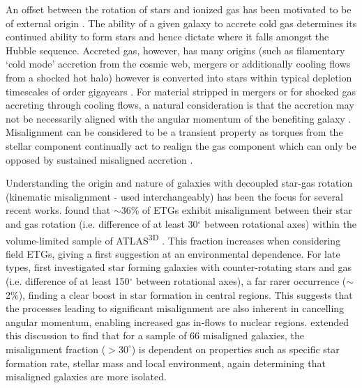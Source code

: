 An offset between the rotation of stars and ionized gas has been motivated to be of external origin \citep[see][]{sarzi2006,davis2011a}. The ability of a given galaxy to accrete cold gas determines its continued ability to form stars and hence dictate where it falls amongst the Hubble sequence. Accreted gas, however, has many origins (such as filamentary `cold mode' accretion from the cosmic web, mergers or additionally cooling flows from a shocked hot halo) however is converted into stars within typical depletion timescales of order gigayears \citep{davis2016}. 
For material stripped in mergers or for shocked gas accreting through cooling flows, a natural consideration is that the accretion may not be necessarily aligned with the angular momentum of the benefiting galaxy \citep[e.g.][]{davis2011, lagos2015}. Misalignment can be considered to be a transient property as torques from the stellar component continually act to realign the gas component which can only be opposed by sustained misaligned accretion \citep[][]{vdvoort2015, davis2016}. 

Understanding the origin and nature of galaxies with decoupled star-gas rotation (kinematic misalignment - used interchangeably) has been the focus for several recent works. \citet{davis2011a} found that $\sim 36$\% of ETGs exhibit misalignment between their star and gas rotation (i.e. difference of at least 30$^{\circ}$ between rotational axes) within the volume-limited sample of ATLAS\textsuperscript{3D} \citep{atlas3d}. This fraction increases when considering field ETGs, giving a first suggestion at an environmental dependence. For late types, \citet{chen2016} first investigated star forming galaxies with counter-rotating stars and gas (i.e. difference of at least 150$^{\circ}$ between rotational axes), a far rarer occurrence ($\sim$2\%), finding a clear boost in star formation in central regions. This suggests that the processes leading to significant misalignment are also inherent in cancelling angular momentum, enabling increased gas in-flows to nuclear regions. \citet{jin2016} extended this discussion to find that for a sample of 66 misaligned galaxies, the misalignment fraction ($> 30^{\circ}$) is dependent on properties such as specific star formation rate, stellar mass and local environment, again determining that misaligned galaxies are more isolated. 

